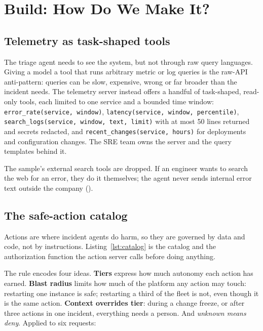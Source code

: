 
\section{Build: How Do We Make It?}
\label{sec:inc-build}

\subsection{Telemetry as task-shaped tools}

The triage agent needs to see the system, but not through raw query languages. Giving a model a tool that runs arbitrary metric or log queries is the raw-API anti-pattern: queries can be slow, expensive, wrong or far broader than the incident needs. The telemetry server instead offers a handful of task-shaped, read-only tools, each limited to one service and a bounded time window: \texttt{error\_rate(service, window)}, \texttt{latency(service, window, percentile)}, \texttt{search\_logs(service, window, text, limit)} with at most 50 lines returned and secrets redacted, and \texttt{recent\_changes(service, hours)} for deployments and configuration changes. The SRE team owns the server and the query templates behind it.

The sample's external search tools are dropped. If an engineer wants to search the web for an error, they do it themselves; the agent never sends internal error text outside the company ().

\subsection{The safe-action catalog}

Actions are where incident agents do harm, so they are governed by data and code, not by instructions. Listing~\ref{lst:catalog} is the catalog and the authorization function the action server calls before doing anything.



The rule encodes four ideas. \textbf{Tiers} express how much autonomy each action has earned. \textbf{Blast radius} limits how much of the platform any action may touch: restarting one instance is safe; restarting a third of the fleet is not, even though it is the same action. \textbf{Context overrides tier}: during a change freeze, or after three actions in one incident, everything needs a person. And \emph{unknown means deny}. Applied to six requests:

